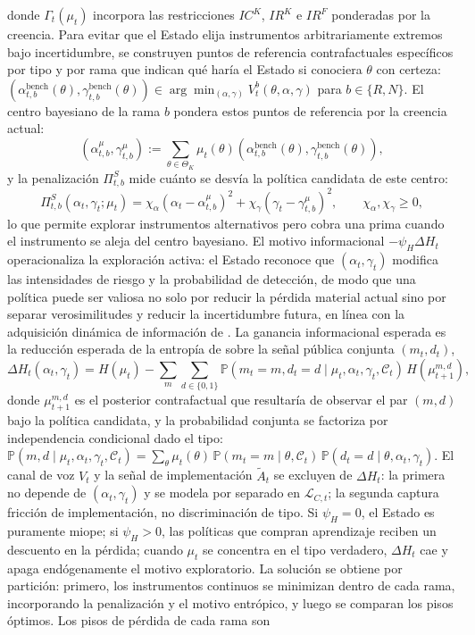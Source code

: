 \documentclass[pdflatex,sn-mathphys-ay]{sn-jnl}
\theoremstyle{thmstyleone}
\theoremstyle{thmstyletwo}
\theoremstyle{thmstylethree}
\newcommand{\Prob}{\mathbb{P}}
\newcommand{\ThetaK}{\Theta_K}
\newcommand{\1}{\mathbf{1}}
\begin{document}
donde $\Gamma_t(\mu_t)$ incorpora las restricciones $IC^K$, $IR^K$ e $IR^F$ ponderadas por la creencia. Para evitar que el Estado elija instrumentos arbitrariamente extremos bajo incertidumbre, se construyen puntos de referencia contrafactuales específicos por tipo y por rama que indican qué haría el Estado si conociera $\theta$ con certeza: $(\alpha_{t,b}^{\mathrm{bench}}(\theta),\gamma_{t,b}^{\mathrm{bench}}(\theta)) \allowbreak \in \allowbreak \arg\min_{(\alpha,\gamma)}V_t^b(\theta,\alpha,\gamma)$ para $b\in\{R,N\}$. El centro bayesiano de la rama $b$ pondera estos puntos de referencia por la creencia actual:
\[
(\alpha_{t,b}^{\mu},\gamma_{t,b}^{\mu}):=\sum_{\theta\in\ThetaK}\mu_t(\theta)(\alpha_{t,b}^{\mathrm{bench}}(\theta),\gamma_{t,b}^{\mathrm{bench}}(\theta)),
\]
y la penalización $\Pi_{t,b}^S$ mide cuánto se desvía la política candidata de este centro:
\begin{equation}
\Pi_{t,b}^S(\alpha_t,\gamma_t;\mu_t)=\chi_\alpha(\alpha_t-\alpha_{t,b}^{\mu})^2+\chi_\gamma(\gamma_t-\gamma_{t,b}^{\mu})^2,\qquad\chi_\alpha,\chi_\gamma\ge 0,
\label{eq:prima-desviacion}
\end{equation}
lo que permite explorar instrumentos alternativos pero cobra una prima cuando el instrumento se aleja del centro bayesiano. El motivo informacional $-\psi_H\Delta H_t$ operacionaliza la exploración activa: el Estado reconoce que $(\alpha_t,\gamma_t)$ modifica las intensidades de riesgo y la probabilidad de detección, de modo que una política puede ser valiosa no solo por reducir la pérdida material actual sino por separar verosimilitudes y reducir la incertidumbre futura, en línea con la adquisición dinámica de información de \citet{Zhong2022}. La ganancia informacional esperada es la reducción esperada de la entropía de \citet{Shannon1948} sobre la señal pública conjunta $(m_t,d_t)$,
\begin{equation}
\Delta H_t(\alpha_t,\gamma_t)=H(\mu_t)-\sum_{m}\sum_{d\in\{0,1\}}\Prob(m_t=m,d_t=d\mid\mu_t,\alpha_t,\gamma_t,\mathcal{C}_t)\,H(\mu_{t+1}^{m,d}),
\label{eq:delta-H}
\end{equation}
donde $\mu_{t+1}^{m,d}$ es el posterior contrafactual que resultaría de observar el par $(m,d)$ bajo la política candidata, y la probabilidad conjunta se factoriza por independencia condicional dado el tipo: $\Prob(m,d\mid\mu_t,\alpha_t,\gamma_t,\mathcal{C}_t)=\sum_{\theta}\mu_t(\theta)\,\Prob(m_t=m\mid\theta,\mathcal{C}_t)\,\Prob(d_t=d\mid\theta,\alpha_t,\gamma_t)$. El canal de voz $V_t$ y la señal de implementación $\tilde{A}_t$ se excluyen de $\Delta H_t$: la primera no depende de $(\alpha_t,\gamma_t)$ y se modela por separado en $\mathcal{L}_{C,t}$; la segunda captura fricción de implementación, no discriminación de tipo. Si $\psi_H=0$, el Estado es puramente miope; si $\psi_H>0$, las políticas que compran aprendizaje reciben un descuento en la pérdida; cuando $\mu_t$ se concentra en el tipo verdadero, $\Delta H_t$ cae y apaga endógenamente el motivo exploratorio. La solución se obtiene por partición: primero, los instrumentos continuos se minimizan dentro de cada rama, incorporando la penalización y el motivo entrópico, y luego se comparan los pisos óptimos. Los pisos de pérdida de cada rama son
\end{document}
